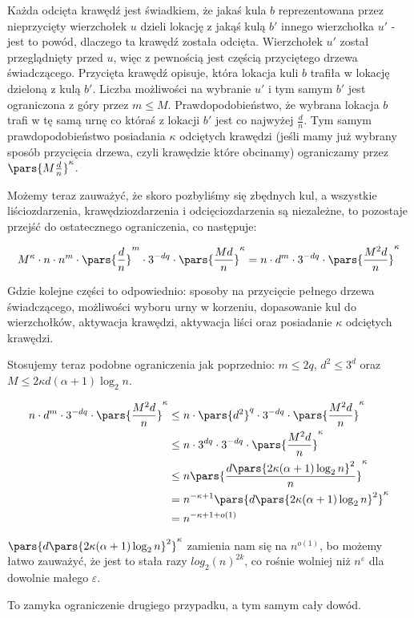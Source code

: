 Każda odcięta krawędź jest świadkiem, że jakaś kula \(b\) reprezentowana przez nieprzycięty wierzchołek \(u\) dzieli lokację z jakąś kulą \(b'\) innego wierzchołka \(u'\) - jest to powód, dlaczego ta krawędź została odcięta.
Wierzchołek \(u'\) został przeglądnięty przed \(u\), więc z pewnością jest częścią przyciętego drzewa świadczącego. Przycięta krawędź opisuje, która lokacja kuli \(b\) trafiła w lokację dzieloną z kulą \(b'\).
Liczba możliwości na wybranie \(u'\) i tym samym \(b'\) jest ograniczona z góry przez \(m \leq M\). Prawdopodobieństwo, że wybrana lokacja \(b\) trafi w tę samą urnę co któraś z lokacji \(b'\) jest co najwyżej \(\frac{d}{n}\).
Tym samym prawdopodobieństwo posiadania \(\kappa\) odciętych krawędzi (jeśli mamy już wybrany sposób przycięcia drzewa, czyli krawędzie które obcinamy) ograniczamy przez \(\pars{M\frac{d}{n}}^\kappa\).

Możemy teraz zauważyć, że skoro pozbyliśmy się zbędnych kul, a wszystkie liściozdarzenia, krawędziozdarzenia i odcięciozdarzenia są niezależne, to pozostaje przejść do ostatecznego ograniczenia, co następuje:

\begin{align*}
	M^\kappa \cdot n \cdot n^{m} \cdot \pars{\frac{d}{n}}^m \cdot 3^{-dq} \cdot \pars{\frac{Md}{n}}^\kappa = n \cdot d^m \cdot 3^{-dq} \cdot \pars{\frac{M^2 d}{n}}^\kappa \\
\end{align*}

Gdzie kolejne części to odpowiednio: sposoby na przycięcie pełnego drzewa świadczącego, możliwości wyboru urny w korzeniu, dopasowanie kul do wierzchołków, aktywacja krawędzi, aktywacja liści oraz posiadanie \(\kappa\) odciętych krawędzi.

Stosujemy teraz podobne ograniczenia jak poprzednio: \(m \leq 2q\), \(d^2 \leq 3^d\) oraz \(M \leq 2\kappa d(\alpha+1)\log_2n\).

\begin{align*}
	n \cdot d^m \cdot 3^{-dq} \cdot \pars{\frac{M^2 d}{n}}^\kappa & \leq n \cdot \pars{d^{2}}^q \cdot 3^{-dq} \cdot \pars{\frac{M^2 d}{n}}^\kappa \\
	                                                              & \leq n \cdot 3^{dq} \cdot 3^{-dq} \cdot \pars{\frac{M^2 d}{n}}^\kappa         \\
	                                                              & \leq n\pars{\frac{d\pars{2\kappa(\alpha+1)\log_2n}^2}{n}}^\kappa              \\
	                                                              & = n^{-\kappa + 1} \pars{d\pars{2\kappa(\alpha+1)\log_2n}^2}^\kappa            \\
	                                                              & = n^{-\kappa+1+o(1)}
\end{align*}

\(\pars{d\pars{2\kappa(\alpha+1)\log_2n}^2}^\kappa\) zamienia nam się na \(n^{o(1)}\), bo możemy łatwo zauważyć, że jest to stała razy \(log_2(n)^{2k}\), co rośnie wolniej niż \(n^\varepsilon\) dla dowolnie małego \(\varepsilon\).

To zamyka ograniczenie drugiego przypadku, a tym samym cały dowód.